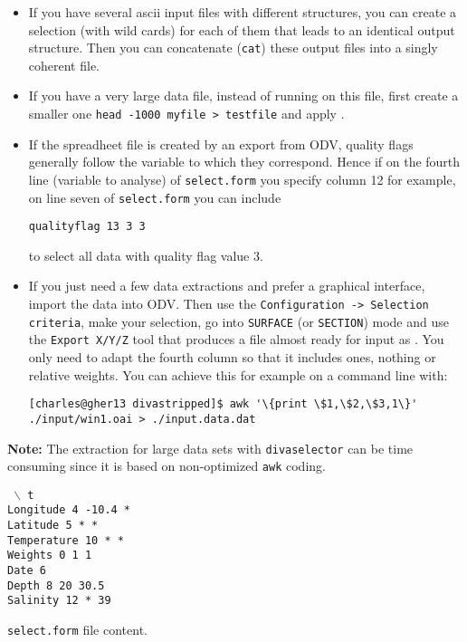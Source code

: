 \begin{itemize}
\item If you have several ascii input files with different structures, you can create a selection (with wild cards) for each of them that leads to an identical output structure. Then you can concatenate ({\tt cat}) these output files into a singly coherent
file.

\item If you have a very large data file, instead of running  on this file, first create a smaller one {\tt head -1000 myfile > testfile} and apply .

\item If the spreadheet file is created by an export from ODV, quality flags generally follow the variable to which they correspond. Hence if on the fourth line (variable to analyse) of {\tt select.form} you specify column 12 for example, on line seven of {\tt select.form} you can include 

{\tt qualityflag  13   3 3}

to select all data with quality flag value 3.

\item If you just need a few data extractions and prefer a graphical interface, import the data into ODV. Then use the
{\tt Configuration -> Selection criteria}, make your selection, go into {\tt SURFACE} (or {\tt SECTION}) mode and use the {\tt Export X/Y/Z} tool that produces a  file almost ready for \diva input as . You only need to adapt the fourth column so that it includes ones, nothing or relative weights. You can achieve this for example on a command line with:
\begin{lstlisting}[style=Bash]
[charles@gher13 divastripped]$ awk '\{print \$1,\$2,\$3,1\}' ./input/win1.oai > ./input.data.dat
\end{lstlisting}
\end{itemize}

{\bf Note:} The extraction for large data sets with {\tt divaselector} can be time consuming since it is based on non-optimized {\tt awk} coding.
 
\begin{exfile}[H]
\begin{footnotesize}
\texttt{
$\backslash$ t\\
Longitude  4  -10.4  *\\
Latitude  5  *  *\\
Temperature  10  *  *\\
Weights   0   1    1\\
Date  6  \\
Depth  8  20  30.5\\
Salinity  12  *  39\\
}
\end{footnotesize}
\caption{{\tt select.form} file content.} 
\end{exfile}


